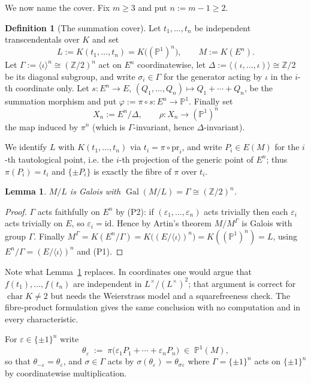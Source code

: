 \documentclass[11pt,a4paper]{article}
\theoremstyle{plain}
\newtheorem{lemma}[theorem]{Lemma}
\theoremstyle{definition}
\newtheorem{definition}[theorem]{Definition}
\DeclareMathOperator{\Gal}{Gal}
\newcommand{\PP}{\mathbb{P}}
\newcommand{\ZZ}{\mathbb{Z}}
\newcommand{\eps}{\varepsilon}
\begin{document}
We now name the cover. Fix $m \ge 3$ and put $n := m-1 \ge 2$.

\begin{definition}[The summation cover]\label{def:cover}
Let $t_1,\dots,t_n$ be independent transcendentals over $K$ and set
\[
  L := K(t_1,\dots,t_n) = K\bigl((\PP^1)^n\bigr), \qquad
  M := K(E^n).
\]
Let $\Gamma := \langle \iota \rangle^n \cong (\ZZ/2)^n$ act on $E^n$
coordinatewise, let $\Delta := \langle (\iota,\dots,\iota) \rangle \cong \ZZ/2$
be its diagonal subgroup, and write $\sigma_i \in \Gamma$ for the generator
acting by $\iota$ in the $i$-th coordinate only.
Let $s \colon E^n \to E$, $(Q_1,\dots,Q_n) \mapsto Q_1 + \cdots + Q_n$, be the
summation morphism and put $\varphi := \pi \circ s \colon E^n \to \PP^1$.
Finally set
\[
  X_n := E^n / \Delta, \qquad \rho \colon X_n \to (\PP^1)^n
\]
the map induced by $\pi^n$ (which is $\Gamma$-invariant, hence $\Delta$-invariant).
\end{definition}

We identify $L$ with $K(t_1,\dots,t_n)$ via $t_i = \pi \circ \mathrm{pr}_i$, and
write $P_i \in E(M)$ for the $i$-th tautological point, i.e. the $i$-th
projection of the generic point of $E^n$; thus $\pi(P_i) = t_i$ and
$\{ \pm P_i \}$ is exactly the fibre of $\pi$ over $t_i$.

\begin{lemma}\label{lem:gamma}
$M/L$ is Galois with $\Gal(M/L) = \Gamma \cong (\ZZ/2)^n$.
\end{lemma}

\begin{proof}
$\Gamma$ acts faithfully on $E^n$ by (P2): if $(\eps_1,\dots,\eps_n)$ acts
trivially then each $\eps_i$ acts trivially on $E$, so $\eps_i = \mathrm{id}$.
Hence by Artin's theorem $M/M^{\Gamma}$ is Galois with group $\Gamma$. Finally
$M^{\Gamma} = K(E^n/\Gamma) = K\bigl((E/\langle\iota\rangle)^n\bigr) = K((\PP^1)^n) = L$,
using $E^n/\Gamma = (E/\langle \iota\rangle)^n$ and (P1).
\end{proof}

Note what Lemma~\ref{lem:gamma} replaces. In coordinates one would argue that
$f(t_1),\dots,f(t_n)$ are independent in $L^{\times}/(L^{\times})^2$; that
argument is correct for $\operatorname{char} K \neq 2$ but needs the Weierstrass
model and a squarefreeness check. The fibre-product formulation gives the same
conclusion with no computation and in every characteristic.

For $\eps \in \{\pm 1\}^n$ write
\begin{equation}\label{eq:root}
  \theta_{\eps} \;:=\; \pi\bigl( \eps_1 P_1 + \cdots + \eps_n P_n \bigr)
  \;\in\; \PP^1(M),
\end{equation}
so that $\theta_{-\eps} = \theta_{\eps}$, and $\sigma \in \Gamma$ acts by
$\sigma(\theta_{\eps}) = \theta_{\sigma \eps}$ where $\Gamma = \{\pm1\}^n$ acts on
$\{\pm1\}^n$ by coordinatewise multiplication.
\end{document}

